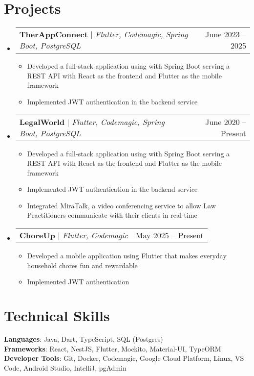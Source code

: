 \documentclass[letterpaper,11pt]{article}
\makeatletter
\newcommand{\resumeItem}[1]{
  \item\small{
    {#1 \vspace{-2pt}}
  }
}
\newcommand{\resumeProjectHeading}[2]{
    \item
    \begin{tabular*}{0.97\textwidth}{l@{\extracolsep{\fill}}r}
      \small#1 & #2 \\
    \end{tabular*}\vspace{-7pt}
}
\newcommand{\resumeSubHeadingListStart}{\begin{itemize}[leftmargin=0.15in, label={}]}
\newcommand{\resumeSubHeadingListEnd}{\end{itemize}}
\newcommand{\resumeItemListStart}{\begin{itemize}}
\newcommand{\resumeItemListEnd}{\end{itemize}\vspace{-5pt}}
\makeatother
\begin{document}
\section{Projects}
    \resumeSubHeadingListStart
      \resumeProjectHeading
          {\textbf{TherAppConnect} $|$ \emph{Flutter, Codemagic, Spring Boot, PostgreSQL}}{June 2023 -- 2025}
          \resumeItemListStart
            \resumeItem{Developed a full-stack application using with Spring Boot serving a REST API with React as the frontend and Flutter as the mobile framework}
            \resumeItem{Implemented JWT authentication in the backend service}
          \resumeItemListEnd
      \resumeProjectHeading
          {\textbf{LegalWorld} $|$ \emph{Flutter, Codemagic, Spring Boot, PostgreSQL}}{June 2020 -- Present}
          \resumeItemListStart
             \resumeItem{Developed a full-stack application using with Spring Boot serving a REST API with React as the frontend and Flutter as the mobile framework}
            \resumeItem{Implemented JWT authentication in the backend service}
            \resumeItem{Integrated MiraTalk, a video conferencing service to allow Law Practitioners communicate with their clients in real-time}
          \resumeItemListEnd
        \resumeProjectHeading
          {\textbf{ChoreUp} $|$ \emph{Flutter, Codemagic}}{May 2025 -- Present}
          \resumeItemListStart
            \resumeItem{Developed a mobile application using Flutter that makes everyday household chores fun and rewardable}
            \resumeItem{Implemented JWT authentication }
          \resumeItemListEnd
    \resumeSubHeadingListEnd



%
\section{Technical Skills}
 \begin{itemize}[leftmargin=0.15in, label={}]
    \small{\item{
     \textbf{Languages}{: Java, Dart, TypeScript, SQL (Postgres)} \\
     \textbf{Frameworks}{: React, NestJS, Flutter, Mockito, Material-UI, TypeORM} \\
     \textbf{Developer Tools}{: Git, Docker, Codemagic, Google Cloud Platform, Linux, VS Code, Android Studio, IntelliJ, pgAdmin} \\
    }}
 \end{itemize}


\end{document}
